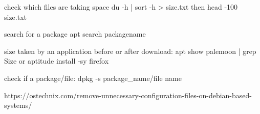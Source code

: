 check which files are taking space
du -h | sort -h > size.txt then head -100 size.txt

search for a package apt search packagename

size taken by an application before or after download:
apt show palemoon | grep Size or aptitude install -sy firefox


check if a package/file: dpkg -s package_name/file name

https://ostechnix.com/remove-unnecessary-configuration-files-on-debian-based-systems/
